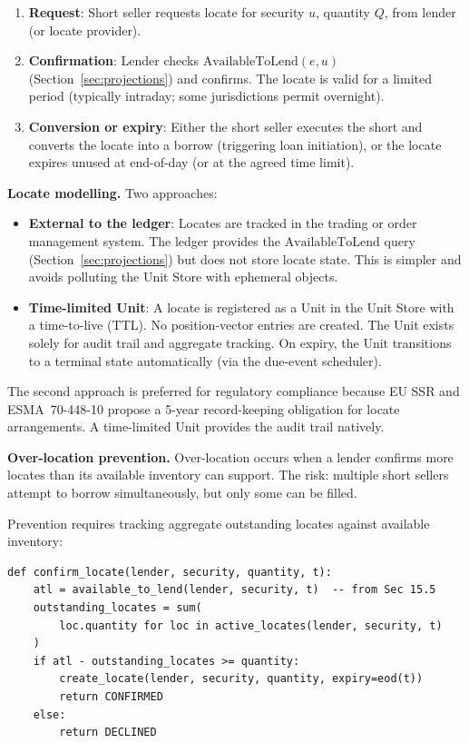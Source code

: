 \documentclass[11pt,a4paper]{article}
\begin{document}
\begin{enumerate}[nosep]
\item \textbf{Request}: Short seller requests locate for security $u$, quantity $Q$, from lender (or locate provider).
\item \textbf{Confirmation}: Lender checks $\text{AvailableToLend}(e, u)$ (Section~\ref{sec:projections}) and confirms. The locate is valid for a limited period (typically intraday; some jurisdictions permit overnight).
\item \textbf{Conversion or expiry}: Either the short seller executes the short and converts the locate into a borrow (triggering loan initiation), or the locate expires unused at end-of-day (or at the agreed time limit).
\end{enumerate}

\medskip
\noindent\textbf{Locate modelling.} Two approaches:

\begin{itemize}[nosep]
\item \textbf{External to the ledger}: Locates are tracked in the trading or order management system. The ledger provides the $\text{AvailableToLend}$ query (Section~\ref{sec:projections}) but does not store locate state. This is simpler and avoids polluting the Unit Store with ephemeral objects.
\item \textbf{Time-limited Unit}: A locate is registered as a Unit in the Unit Store with a time-to-live (TTL). No position-vector entries are created. The Unit exists solely for audit trail and aggregate tracking. On expiry, the Unit transitions to a terminal state automatically (via the due-event scheduler).
\end{itemize}

\noindent The second approach is preferred for regulatory compliance because EU SSR and ESMA~70-448-10 propose a 5-year record-keeping obligation for locate arrangements. A time-limited Unit provides the audit trail natively.

\medskip
\noindent\textbf{Over-location prevention.} Over-location occurs when a lender confirms more locates than its available inventory can support. The risk: multiple short sellers attempt to borrow simultaneously, but only some can be filled.

Prevention requires tracking aggregate outstanding locates against available inventory:

\begin{lstlisting}
def confirm_locate(lender, security, quantity, t):
    atl = available_to_lend(lender, security, t)  -- from Sec 15.5
    outstanding_locates = sum(
        loc.quantity for loc in active_locates(lender, security, t)
    )
    if atl - outstanding_locates >= quantity:
        create_locate(lender, security, quantity, expiry=eod(t))
        return CONFIRMED
    else:
        return DECLINED
\end{lstlisting}
\end{document}
